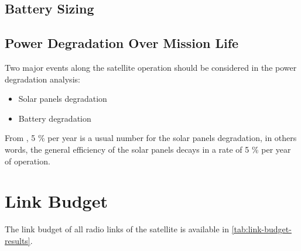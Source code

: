 \subsection{Battery Sizing}

\subsection{Power Degradation Over Mission Life}

Two major events along the satellite operation should be considered in the power degradation analysis:

\begin{itemize}
    \item Solar panels degradation
    \item Battery degradation
\end{itemize}

From \cite{larson2005}, 5 \% per year is a usual number for the solar panels degradation, in others words, the general efficiency of the solar panels decays in a rate of 5 \% per year of operation.

\section{Link Budget}

The link budget of all radio links of the satellite is available in \autoref{tab:link-budget-results}.

